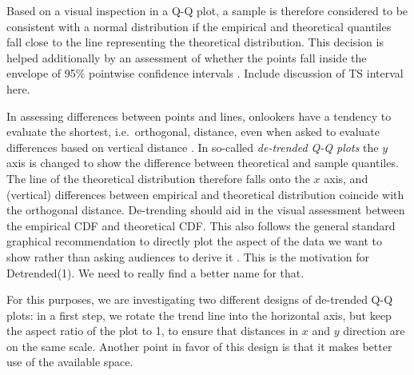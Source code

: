 \documentclass{article}\usepackage[]{graphicx}\usepackage[]{color}
\newcommand{\hh}[1]{{\color{magenta} #1}}
\newcommand{\alnote}[1]{\todo[inline,color=green!40]{#1}}
\newcommand{\hhnote}[1]{\todo[inline,color=magenta!40]{#1}}
\begin{document}


Based on a visual inspection in a Q-Q plot, a
 sample is therefore considered to be consistent with a normal distribution if the empirical and theoretical quantiles fall close to the line representing the theoretical distribution.  This decision is helped additionally by an assessment of
 whether the points fall inside the envelope of 95\%  pointwise confidence intervals \citep[][p.~150--154]{Davison:1997}.
\hh{Include discussion of TS interval here.} 

In assessing differences between points and lines, onlookers have a tendency to evaluate the shortest, i.e.~orthogonal, distance, even when asked to evaluate differences based on vertical distance \citep{sineillusion, robbins:2005, cleveland:1984}. 
In so-called {\it de-trended Q-Q plots} \citep[][p.~25--26]{thode:2002} the $y$ axis is changed to show the difference between theoretical and sample quantiles. The line of the theoretical distribution therefore falls onto the $x$ axis, and (vertical) differences between empirical and theoretical distribution coincide with the orthogonal distance. 
De-trending should aid in the visual assessment between the empirical CDF and theoretical CDF. This also follows the general standard graphical recommendation to directly plot the aspect of the data we want to show rather than asking audiences to derive it \citep{wainer:2000}.
\hh{This is the motivation for Detrended(1). We need to really find a better name for that.}

\hh{For this purposes, we are investigating two different designs of de-trended Q-Q plots: in a first step, we rotate the trend line into the horizontal axis, but keep the aspect ratio of the plot to 1, to ensure that distances in $x$ and $y$ direction are on the same scale. 
}
Another point in favor of this design is that it makes better use of the available space.
\end{document}
